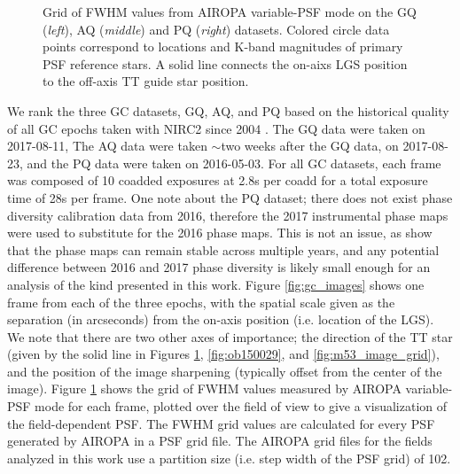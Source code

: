 \documentclass[]{spie}  %
\begin{document}
\begin{figure}
 \caption{\footnotesize Grid of FWHM values from AIROPA variable-PSF mode on the GQ (\textit{left}), AQ (\textit{middle}) and PQ (\textit{right}) datasets. Colored circle data points correspond to locations and K-band magnitudes of primary PSF reference stars. A solid line connects the on-aixs LGS position to the off-axis TT guide star position. \label{fig:fwhm_grids}}
\end{figure}

\indent We rank the three GC datasets, GQ, AQ, and PQ based on the historical quality of all GC epochs taken with NIRC2 since 2004 \cite{jia:2019a}. The GQ data were taken on 2017-08-11, The AQ data were taken $\sim$two weeks after the GQ data, on 2017-08-23, and the PQ data were taken on 2016-05-03. For all GC datasets, each frame was composed of 10 coadded exposures at 2.8s per coadd for a total exposure time of 28s per frame. One note about the PQ dataset; there does not exist phase diversity calibration data from 2016, therefore the 2017 instrumental phase maps were used to substitute for the 2016 phase maps. This is not an issue, as \cite{Ciurlo:inprep} show that the phase maps can remain stable across multiple years, and any potential difference between 2016 and 2017 phase diversity is likely small enough for an analysis of the kind presented in this work. Figure \ref{fig:gc_images} shows one frame from each of the three epochs, with the spatial scale given as the separation (in arcseconds) from the on-axis position (i.e. location of the LGS). We note that there are two other axes of importance; the direction of the TT star (given by the solid line in Figures \ref{fig:fwhm_grids}, \ref{fig:ob150029}, and \ref{fig:m53_image_grid}), and the position of the image sharpening (typically offset from the center of the image). Figure \ref{fig:fwhm_grids} shows the grid of FWHM values measured by AIROPA variable-PSF mode for each frame, plotted over the field of view to give a visualization of the field-dependent PSF. The FWHM grid values are calculated for every PSF generated by AIROPA in a PSF grid file. The AIROPA grid files for the fields analyzed in this work use a partition size (i.e. step width of the PSF grid) of 102. 
\end{document}
